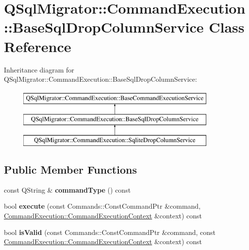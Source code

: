 \hypertarget{class_q_sql_migrator_1_1_command_execution_1_1_base_sql_drop_column_service}{}\section{Q\+Sql\+Migrator\+:\+:Command\+Execution\+:\+:Base\+Sql\+Drop\+Column\+Service Class Reference}
\label{class_q_sql_migrator_1_1_command_execution_1_1_base_sql_drop_column_service}
Inheritance diagram for Q\+Sql\+Migrator\+:\+:Command\+Execution\+:\+:Base\+Sql\+Drop\+Column\+Service\+:\begin{figure}[H]
\begin{center}
\leavevmode
\includegraphics[height=3.000000cm]{class_q_sql_migrator_1_1_command_execution_1_1_base_sql_drop_column_service}
\end{center}
\end{figure}
\subsection*{Public Member Functions}
\begin{DoxyCompactItemize}
\item 
\mbox{\label{class_q_sql_migrator_1_1_command_execution_1_1_base_sql_drop_column_service_a33d2a527a1ab1ae8a30af11bfee4c28a}} 
const Q\+String \& {\bfseries command\+Type} () const
\item 
\mbox{\label{class_q_sql_migrator_1_1_command_execution_1_1_base_sql_drop_column_service_a23b89113a9f772302391405c0ad26bc0}} 
bool {\bfseries execute} (const Commands\+::\+Const\+Command\+Ptr \&command, \hyperlink{class_q_sql_migrator_1_1_command_execution_1_1_command_execution_context}{Command\+Execution\+::\+Command\+Execution\+Context} \&context) const
\item 
\mbox{\label{class_q_sql_migrator_1_1_command_execution_1_1_base_sql_drop_column_service_a69976d59f0a4aaaefeee4b74f0056be7}} 
bool {\bfseries is\+Valid} (const Commands\+::\+Const\+Command\+Ptr \&command, const \hyperlink{class_q_sql_migrator_1_1_command_execution_1_1_command_execution_context}{Command\+Execution\+::\+Command\+Execution\+Context} \&context) const
\end{DoxyCompactItemize}
